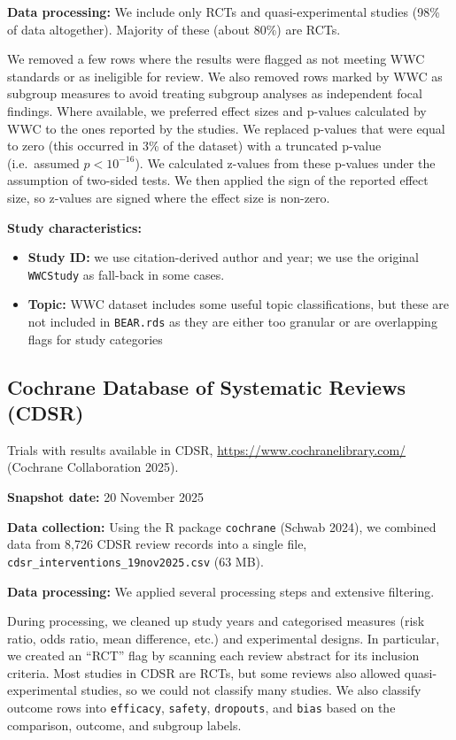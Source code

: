 \documentclass[
  11pt,
]{article}
\providecommand{\tightlist}{%
  \setlength{\itemsep}{0pt}\setlength{\parskip}{0pt}}
\begin{document}
\textbf{Data processing:} We include only RCTs and quasi-experimental
studies (98\% of data altogether). Majority of these (about 80\%) are
RCTs.

We removed a few rows where the results were flagged as not meeting WWC
standards or as ineligible for review. We also removed rows marked by
WWC as subgroup measures to avoid treating subgroup analyses as
independent focal findings. Where available, we preferred effect sizes
and p-values calculated by WWC to the ones reported by the studies. We
replaced p-values that were equal to zero (this occurred in 3\% of the
dataset) with a truncated p-value (i.e.~assumed \(p < 10^{-16}\)). We
calculated z-values from these p-values under the assumption of
two-sided tests. We then applied the sign of the reported effect size,
so z-values are signed where the effect size is non-zero.

\textbf{Study characteristics:}

\begin{itemize}
\tightlist
\item
  \textbf{Study ID:} we use citation-derived author and year; we use the
  original \texttt{WWCStudy} as fall-back in some cases.
\item
  \textbf{Topic:} WWC dataset includes some useful topic
  classifications, but these are not included in \texttt{BEAR.rds} as
  they are either too granular or are overlapping flags for study
  categories
\end{itemize}

\newpage

\subsection{Cochrane Database of Systematic Reviews
(CDSR)}\label{cochrane-database-of-systematic-reviews-cdsr}

Trials with results available in CDSR,
\url{https://www.cochranelibrary.com/} (Cochrane Collaboration 2025).

\textbf{Snapshot date:} 20 November 2025

\textbf{Data collection:} Using the R package \texttt{cochrane} (Schwab
2024), we combined data from 8,726 CDSR review records into a single
file, \texttt{cdsr\_interventions\_19nov2025.csv} (63 MB).

\textbf{Data processing:} We applied several processing steps and
extensive filtering.

During processing, we cleaned up study years and categorised measures
(risk ratio, odds ratio, mean difference, etc.) and experimental
designs. In particular, we created an ``RCT'' flag by scanning each
review abstract for its inclusion criteria. Most studies in CDSR are
RCTs, but some reviews also allowed quasi-experimental studies, so we
could not classify many studies. We also classify outcome rows into
\texttt{efficacy}, \texttt{safety}, \texttt{dropouts}, and \texttt{bias}
based on the comparison, outcome, and subgroup labels.
\end{document}
